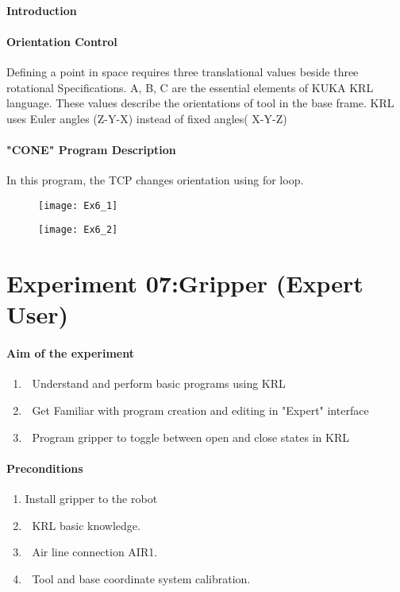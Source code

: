 \documentclass[]{book}
\begin{document}
\paragraph{Introduction}
\paragraph{Orientation Control}
Defining a point in space requires three translational values beside three rotational Specifications.
A, B, C are the essential elements of KUKA KRL language. These values describe the orientations of tool in the base frame. KRL uses Euler angles (Z-Y-X) instead of fixed angles( X-Y-Z)
\paragraph{"CONE" Program Description}
In this program, the TCP changes orientation using for loop. 
\begin{figure}[H]
	\centering
	\texttt{[image: Ex6\_1]}
\end{figure}
\begin{figure}[H]
	\centering
	\texttt{[image: Ex6\_2]}
\end{figure}
\section{Experiment 07:Gripper (Expert User)}
\paragraph{Aim of the experiment}
\begin{enumerate}
	\item 	Understand and perform basic programs using KRL
	\item 	Get Familiar with program creation and editing in "Expert" interface
	\item 	Program gripper to toggle between open and close states in KRL
\end{enumerate}
\paragraph{Preconditions}
\begin{enumerate}
	\item Install gripper to the robot
	\item 	KRL basic knowledge.
	\item 	Air line connection AIR1. 
	\item 	Tool and base coordinate system calibration.
\end{enumerate}
\newpage
\end{document}
